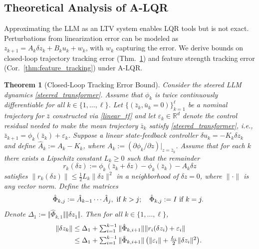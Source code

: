 \documentclass{article}
\theoremstyle{plain}
\newtheorem{theorem}{Theorem}[section]
\theoremstyle{definition}
\theoremstyle{remark}
\begin{document}
\vspace{-7pt}
\subsection{Theoretical Analysis of A-LQR}\label{sec:theory}

Approximating the LLM as an LTV system enables LQR tools but is not exact. Perturbations from linearization error can be modeled as $z_{k+1} = A_k \delta z_k + B_ku_k + w_k$, with $w_k$ capturing the error. 
We derive bounds on closed-loop trajectory tracking error (Thm.~\ref{thm:tracking}) and feature strength tracking error (Cor.~\ref{thm:feature_tracking}) under A-LQR.

\begin{theorem}[Closed-Loop Tracking Error Bound]\label{thm:tracking}
Consider the steered LLM dynamics \eqref{steered_transformer}. Assume that $\phi_k$ is twice continuously differentiable for all $k \in \{1,\ldots,\ell\}$. Let $\{(\bar z_k,\bar u_k=0)\}_{k=1}^\ell$ be a nominal trajectory for $\bar z$ constructed via \eqref{linear_tf} and let $\varepsilon_k \in \mathbb{R}^d$ denote the control residual needed to make the mean trajectory $\bar z_k$ satisfy \eqref{steered_transformer}, i.e., $\bar z_{k+1} = \phi_k(\bar z_k) + \varepsilon_k$.
Suppose a linear state-feedback controller $\delta u_k = -K_k \delta z_k$ and define
$\hat A_k := A_k - K_k$, where $A_k := (\partial\phi_k/\partial z)|_{z=\bar z_k}$. Assume that for each $k$ there exists a Lipschitz constant $L_k \ge 0$ such that the remainder
\begin{equation}\label{eq:remainder}
    r_k(\delta z) := \phi_k(\bar z_k+\delta z) - \phi_k(\bar z_k) - A_k \delta z
\end{equation}
satisfies
$\|r_k(\delta z)\| \le \frac{1}{2} L_k \|\delta z\|^2$ in a neighborhood of $\delta z = 0$, where $\|\cdot\|$ is any vector norm.
Define the matrices 
\begin{equation}\label{eq:transition_matrices}
    \hspace{-5pt}\hat\Phi_{k,j} := \hat A_{k-1} \cdots \hat A_j, \textrm{ if } k>j;\quad \hat\Phi_{k,j} := I \textrm{ if } k=j.
\end{equation}
Denote $\Delta_1:=\Vert \hat\Phi_{k,1} \Vert \Vert \delta z_1\Vert$. Then for all $k \in \{1,\ldots, \ell\}$,
\begin{subequations}\label{eq:tracking_error_bound}
    \begin{align}
        \hspace{-13pt}\Vert \delta z_k\Vert  &\le  \Delta_1  + \textstyle\sum_{i=1}^{k-1} \Vert \hat\Phi_{k,i+1}\Vert \Vert r_i(\delta z_i)+\varepsilon_i\Vert \\
        &\le \Delta_1 + \textstyle\sum_{i=1}^{k-1} \|\hat\Phi_{k,i+1}\|\, \big(\Vert \varepsilon_i\Vert + \frac{L_i}{2}\|\delta z_i\|^2 \big).\hspace{-10pt}
    \end{align}
\end{subequations}
\end{theorem}
\end{document}
